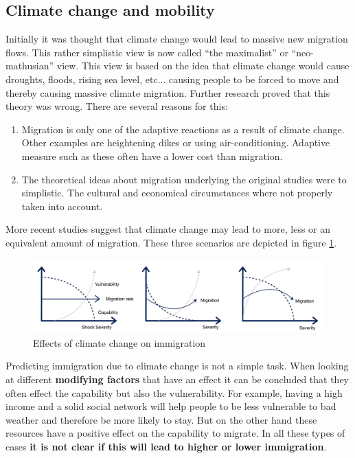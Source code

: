 \documentclass[../summary.tex]{subfiles}
\begin{document}
	
	\subsection{Climate change and mobility}
	Initially it was thought that climate change would lead to  massive new migration flows. This rather simplistic view is now called ``the maximalist'' or ``neo-mathusian'' view. This view is based on the idea that climate change would cause droughts, floods, rising sea level, etc... causing people to be forced to move and thereby causing massive climate migration. Further research proved that this theory was wrong. There are several reasons for this: 
	\begin{enumerate}
		\item Migration is only one of the adaptive reactions as a result of climate change. Other examples are heightening dikes or using air-conditioning.  Adaptive measure such as these often have a lower cost than migration.
		\item The theoretical ideas about migration underlying the original studies were to simplistic. The cultural and economical circumstances where not properly taken into account. 
	\end{enumerate}
	More recent studies suggest that climate change may lead to more, less or an equivalent amount of migration. These three scenarios are depicted in figure \ref{fig:7-climate-change}.
	\begin{figure}[h]
		\centering
		\includegraphics[width=0.7\linewidth]{../images/7-climate-change}
		\caption{Effects of climate change on immigration}
		\label{fig:7-climate-change}
	\end{figure}
	Predicting immigration due to climate change is not a simple task. When looking at different \textbf{modifying factors} that have an effect it can be concluded that they often effect the capability but also the vulnerability. For example, having a high income and a solid social network will help people to be less vulnerable to bad weather and therefore be more likely to stay. But on the other hand these resources have a positive effect on the capability to migrate. In all these types of cases \textbf{it is not clear if this will lead to higher or lower immigration}.
	
\end{document}
